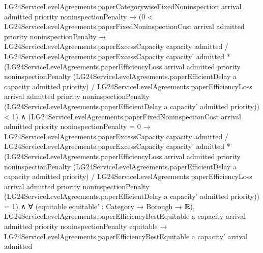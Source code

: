 \documentclass[10pt]{article}
\begin{document}
\begin{ReviewVerbatim}
                        LG24ServiceLevelAgreements.paperCategorywiseFixedNoninspection arrival admitted priority
                            noninspectionPenalty →
                          (0 <
                                LG24ServiceLevelAgreements.paperFixedNoninspectionCost arrival admitted priority
                                  noninspectionPenalty →
                              LG24ServiceLevelAgreements.paperExcessCapacity capacity admitted /
                                    LG24ServiceLevelAgreements.paperExcessCapacity capacity' admitted *
                                  (LG24ServiceLevelAgreements.paperEfficiencyLoss arrival admitted priority
                                      noninspectionPenalty
                                      (LG24ServiceLevelAgreements.paperEfficientDelay a capacity admitted priority) /
                                    LG24ServiceLevelAgreements.paperEfficiencyLoss arrival admitted priority
                                      noninspectionPenalty
                                      (LG24ServiceLevelAgreements.paperEfficientDelay a capacity' admitted priority)) <
                                1) ∧
                            (LG24ServiceLevelAgreements.paperFixedNoninspectionCost arrival admitted priority
                                    noninspectionPenalty =
                                  0 →
                                LG24ServiceLevelAgreements.paperExcessCapacity capacity admitted /
                                      LG24ServiceLevelAgreements.paperExcessCapacity capacity' admitted *
                                    (LG24ServiceLevelAgreements.paperEfficiencyLoss arrival admitted priority
                                        noninspectionPenalty
                                        (LG24ServiceLevelAgreements.paperEfficientDelay a capacity admitted priority) /
                                      LG24ServiceLevelAgreements.paperEfficiencyLoss arrival admitted priority
                                        noninspectionPenalty
                                        (LG24ServiceLevelAgreements.paperEfficientDelay a capacity' admitted
                                          priority)) =
                                  1) ∧
                              ∀ (equitable equitable' : Category → Borough → ℝ),
                                LG24ServiceLevelAgreements.paperEfficiencyBestEquitable a capacity arrival admitted
                                    priority noninspectionPenalty equitable →
                                  LG24ServiceLevelAgreements.paperEfficiencyBestEquitable a capacity' arrival admitted

\end{ReviewVerbatim}
\end{document}
